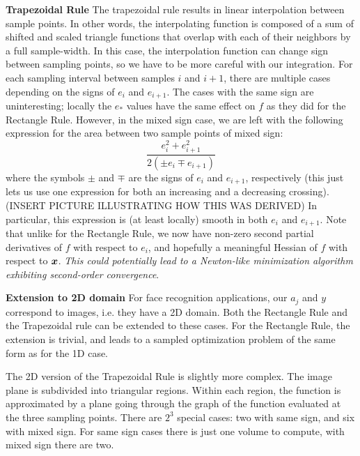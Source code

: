 \documentclass[12pt,journal,draftcls,letterpaper,onecolumn]{IEEEtran}
\begin{document}
{\bf Trapezoidal Rule}  The trapezoidal rule results in linear interpolation between sample points.  In other words, the interpolating function is composed of a sum of shifted and scaled triangle functions that overlap with each of their neighbors by a full sample-width.  In this case, the interpolation function can change sign between sampling points, so we have to be more careful with our integration.  For each sampling interval between samples $i$ and $i+1$, there are multiple cases depending on the signs of $e_i$ and $e_{i+1}$.  The cases with the same sign are uninteresting; locally the $e_*$ values have the same effect on $f$ as they did for the Rectangle Rule.  However, in the mixed sign case, we are left with the following expression for the area between two sample points of mixed sign:
\begin{equation}\label{eqn:trapezoid_smoothing}
 \frac{e_i^2 + e_{i+1}^2}{2(\pm e_i \mp e_{i+1})}
\end{equation}
where the symbols $\pm$ and $\mp$ are the signs of $e_i$ and $e_{i+1}$, respectively (this just lets us use one expression for both an increasing and a decreasing crossing). (INSERT PICTURE ILLUSTRATING HOW THIS WAS DERIVED) In particular, this expression is (at least locally) smooth in both $e_i$ and $e_{i+1}$.  Note that unlike for the Rectangle Rule, we now have non-zero second partial derivatives of $f$ with respect to $e_i$, and hopefully a meaningful Hessian of $f$ with respect to ${\boldsymbol{x}}$.  {\em This could potentially lead to a Newton-like minimization algorithm exhibiting second-order convergence}.  




{\bf Extension to 2D domain} For face recognition applications, our $a_j$ and $y$ correspond to images, i.e. they have a 2D domain.  Both the Rectangle Rule and the Trapezoidal rule can be extended to these cases.  For the Rectangle Rule, the extension is trivial, and leads to a sampled optimization problem of the same form as for the 1D case.  

The 2D version of the Trapezoidal Rule is slightly more complex.  The image plane is subdivided into triangular regions.  Within each region, the function is approximated by a plane going through the graph of the function evaluated at the three sampling points.  There are $2^3$ special cases: two with same sign, and six with mixed sign.  For same sign cases there is just one volume to compute, with mixed sign there are two.  
\end{document}

